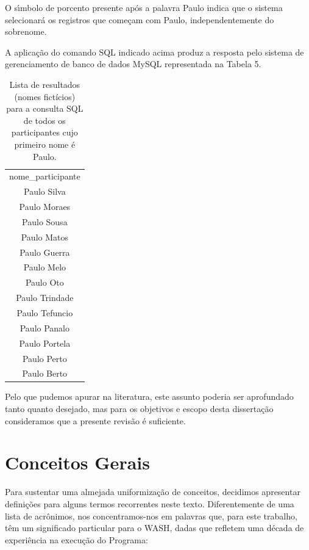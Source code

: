 \documentclass[
12pt,		%
openright,	%
twoside,  %
a4paper,			%
chapter=TITLE,		%
english,			%
french,				%
spanish,			%
brazil				%
]{USPSC-classe/USPSC}
\begin{document}
O s\'{\i}mbolo de porcento presente ap\'os a palavra \textquotedbl  Paulo \textquotedbl  indica que o sistema selecionar\'a os registros que come\c{c}am com \textquotedbl Paulo\textquotedbl , independentemente do sobrenome.








A aplica\c{c}\~ao do comando SQL indicado acima produz a resposta pelo sistema de gerenciamento de banco de dados MySQL representada na Tabela 5.












\begin{table}[htb]
\tiny
\caption{\label{fe3cd6334e1b9072eda70730e1734e26869d9c57}Lista de resultados (nomes fict\'{i}cios) para a consulta SQL de todos os participantes cujo primeiro nome \'e Paulo.}

\centering
\begin{tabular}{|c|}
\hline
nome\_participante        \\
Paulo Silva              \\
Paulo Moraes \\
Paulo Sousa \\
Paulo Matos \\
Paulo Guerra \\
Paulo Melo \\
Paulo Oto \\
Paulo Trindade \\
Paulo Tefuncio \\
Paulo Panalo \\
Paulo Portela \\
Paulo Perto \\
Paulo Berto \\
\hline
\end{tabular}
\end{table}


Pelo que pudemos apurar na literatura, este assunto poderia ser aprofundado tanto quanto desejado, mas para os objetivos e escopo desta disserta\c{c}\~ao consideramos que a presente revis\~ao \'e suficiente.








\section[Conceitos Gerais]{Conceitos Gerais}\label{Conceitos Gerais}
Para sustentar uma almejada uniformiza\c{c}\~ao de conceitos, decidimos apresentar defini\c{c}\~oes para alguns termos recorrentes neste texto. Diferentemente de uma lista de acr\^onimos, nos concentramos-nos em palavras que, para este trabalho, t\^em um significado particular para o  WASH, dadas que refletem uma d\'ecada de experi\^encia na execu\c{c}\~ao do Programa:
\end{document}
